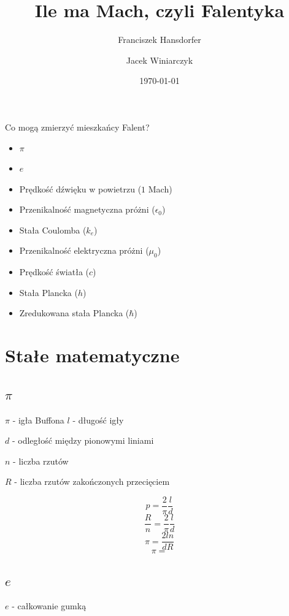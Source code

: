 \documentclass{beamer}
\title{Ile ma Mach, czyli Falentyka}
\author{Franciszek Hansdorfer \and Jacek Winiarczyk}
\institute{Wydiział fizyki doświadczalnej instytutu Marii Mach}
\date{\today}
\begin{document}
\begin{frame}
\titlepage
\end{frame}

\begin{frame}{Co mogą zmierzyć mieszkańcy Falent?}
\begin{itemize}
\item $\pi$
\item $e$
\item Prędkość dźwięku w powietrzu ($1$ Mach)
\item Przenikalność magnetyczna próżni ($\epsilon_0$)
\item Stała Coulomba ($k_e$)
\item Przenikalność elektryczna próżni ($\mu_0$)
\item Prędkość światła ($c$)
\item Stała Plancka ($h$)
\item Zredukowana stała Plancka ($\hbar$)
\end{itemize}

\end{frame}

\section{Stałe matematyczne}

\subsection{$\pi$}

\begin{frame}{$\pi$ - igła Buffona}
$l$ - długość igły

$d$ - odległość między pionowymi liniami

$n$ - liczba rzutów

$R$ - liczba rzutów zakończonych przecięciem

$$p = \frac{2}{\pi} \frac{l}{d}$$
$$\frac{R}{n} = \frac{2}{\pi}\frac{l}{d}$$
$$\pi = \frac{2 l n}{d R}$$
$$\pi =$$

\end{frame}

\subsection{$e$}

\begin{frame}{$e$ - całkowanie gumką}

\end{frame}
\end{document}
